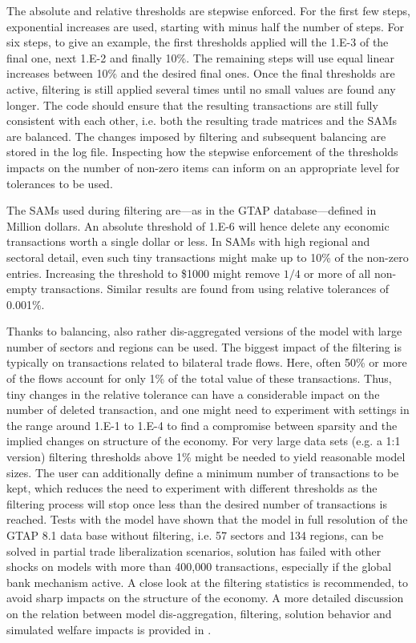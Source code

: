 The absolute and relative thresholds are stepwise enforced. For the first few
steps, exponential increases are used, starting with minus half the number of
steps. For six steps, to give an example, the first thresholds applied will the
1.E-3 of the final one, next 1.E-2 and finally 10\%. The remaining steps will
use equal linear increases between 10\% and the desired final ones. Once the
final thresholds are active, filtering is still applied several times until no
small values are found any longer. The code should ensure that the resulting
transactions are still fully consistent with each other, i.e. both the resulting
trade matrices and the SAMs are balanced. The changes imposed by filtering and
subsequent balancing are stored in the log file. Inspecting how the stepwise
enforcement of the thresholds impacts on the number of non-zero items can inform
on an appropriate level for tolerances to be used.

The SAMs used during filtering are---as in the GTAP database---defined in
Million dollars. An absolute threshold of 1.E-6 will hence delete any economic
transactions worth a single dollar or less. In SAMs with high regional and
sectoral detail, even such tiny transactions might make up to 10\% of the
non-zero entries. Increasing the threshold to \$1000 might remove $\text{1/4}$
or more of all non-empty transactions. Similar results are found from using
relative tolerances of 0.001\%.

Thanks to balancing, also rather dis-aggregated versions of the model with large
number of sectors and regions can be used. The biggest impact of the filtering
is typically on transactions related to bilateral trade flows. Here, often 50\%
or more of the flows account for only 1\% of the total value of these
transactions. Thus, tiny changes in the relative tolerance can have a
considerable impact on the number of deleted transaction, and one might need to
experiment with settings in the range around 1.E-1 to 1.E-4 to find a compromise
between sparsity and the implied changes on structure of the economy. For very
large data sets (e.g. a 1:1 version) filtering thresholds above 1\% might be
needed to yield reasonable model sizes. The user can additionally define a
minimum number of transactions to be kept, which reduces the need to experiment
with different thresholds as the filtering process will stop once less than the
desired number of transactions is reached. Tests with the model have shown that
the model in full resolution of the GTAP 8.1 data base without filtering, i.e.
57 sectors and 134 regions, can be solved in partial trade liberalization
scenarios, solution has failed with other shocks on models with more than
400,000 transactions, especially if the global bank mechanism active. A close
look at the filtering statistics is recommended, to avoid sharp impacts on the
structure of the economy. A more detailed discussion on the relation between
model dis-aggregation, filtering, solution behavior and simulated welfare
impacts is provided in \cite{BritzvdmEconMod2016}.

